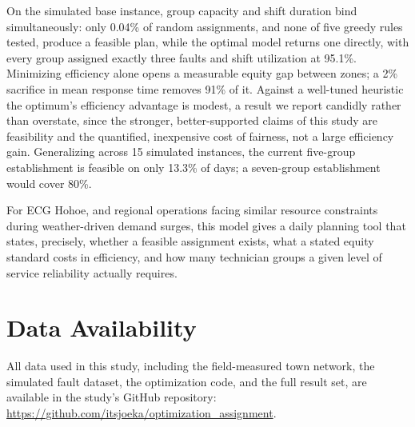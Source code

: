 \documentclass[11pt]{article}
\begin{document}
On the simulated base instance, group capacity and shift duration bind simultaneously: only 0.04\% of random assignments, and none of five greedy rules tested, produce a feasible plan, while the optimal model returns one directly, with every group assigned exactly three faults and shift utilization at 95.1\%. Minimizing efficiency alone opens a measurable equity gap between zones; a 2\% sacrifice in mean response time removes 91\% of it. Against a well-tuned heuristic the optimum's efficiency advantage is modest, a result we report candidly rather than overstate, since the stronger, better-supported claims of this study are feasibility and the quantified, inexpensive cost of fairness, not a large efficiency gain. Generalizing across 15 simulated instances, the current five-group establishment is feasible on only 13.3\% of days; a seven-group establishment would cover 80\%.

For ECG Hohoe, and regional operations facing similar resource constraints during weather-driven demand surges, this model gives a daily planning tool that states, precisely, whether a feasible assignment exists, what a stated equity standard costs in efficiency, and how many technician groups a given level of service reliability actually requires.

\section*{Data Availability}
All data used in this study, including the field-measured town network, the simulated fault dataset, the optimization code, and the full result set, are available in the study's GitHub repository: \url{https://github.com/itsjoeka/optimization_assignment}.

\end{document}
